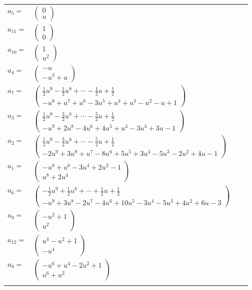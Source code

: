 \documentclass[1p]{elsarticle_modified}
\theoremstyle{definition}
\begin{document}
\begin{tabular}{m{7pt} m{180pt} m{7pt} m{180pt} }
\flushright $a_{5}=$&$\begin{pmatrix}0\\u\end{pmatrix}$ \\
\flushright $a_{11}=$&$\begin{pmatrix}1\\0\end{pmatrix}$ \\
\flushright $a_{10}=$&$\begin{pmatrix}1\\u^2\end{pmatrix}$ \\
\flushright $a_{4}=$&$\begin{pmatrix}- u\\- u^3+u\end{pmatrix}$ \\
\flushright $a_{7}=$&$\begin{pmatrix}\frac{1}{2} u^9-\frac{1}{2} u^8+\cdots-\frac{1}{2} u+\frac{1}{2}\\- u^8+u^7+u^6-3 u^5+u^4+u^3- u^2- u+1\end{pmatrix}$ \\
\flushright $a_{3}=$&$\begin{pmatrix}\frac{1}{2} u^9-\frac{3}{2} u^8+\cdots-\frac{5}{2} u+\frac{1}{2}\\- u^9+2 u^8-4 u^6+4 u^5+u^4-3 u^3+3 u-1\end{pmatrix}$ \\
\flushright $a_{2}=$&$\begin{pmatrix}\frac{1}{2} u^9-\frac{3}{2} u^8+\cdots-\frac{5}{2} u+\frac{1}{2}\\-2 u^9+3 u^8+u^7-8 u^6+5 u^5+3 u^4-5 u^3-2 u^2+4 u-1\end{pmatrix}$ \\
\flushright $a_{1}=$&$\begin{pmatrix}- u^8+u^6-3 u^4+2 u^2-1\\u^8+2 u^4\end{pmatrix}$ \\
\flushright $a_{6}=$&$\begin{pmatrix}-\frac{1}{2} u^9+\frac{1}{2} u^8+\cdots+\frac{1}{2} u+\frac{1}{2}\\- u^9+3 u^8-2 u^7-4 u^6+10 u^5-3 u^4-5 u^3+4 u^2+6 u-3\end{pmatrix}$ \\
\flushright $a_{9}=$&$\begin{pmatrix}- u^2+1\\u^2\end{pmatrix}$ \\
\flushright $a_{12}=$&$\begin{pmatrix}u^4- u^2+1\\- u^4\end{pmatrix}$ \\
\flushright $a_{8}=$&$\begin{pmatrix}- u^6+u^4-2 u^2+1\\u^6+u^2\end{pmatrix}$\\&\end{tabular}
\end{document}

